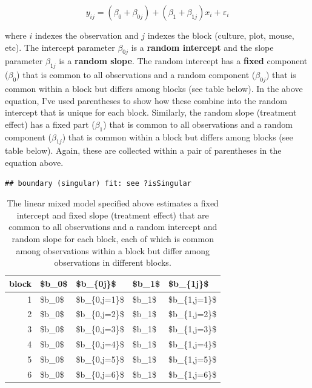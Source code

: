 \documentclass[]{book}
\begin{document}
\begin{equation}
y_{ij} = (\beta_{0} + \beta_{0j}) + (\beta_{1} + \beta_{1j}) x_i + \varepsilon_i 
\label{eq:lmm-spec1}
\end{equation}

where \(i\) indexes the observation and \(j\) indexes the block
(culture, plot, mouse, etc). The intercept parameter \(\beta_{0j}\) is a
\textbf{random intercept} and the slope parameter \(\beta_{1j}\) is a
\textbf{random slope}. The random intercept has a \textbf{fixed}
component (\(\beta_0\)) that is common to all observations and a random
component (\(\beta_{0j}\)) that is common within a block but differs
among blocks (see table below). In the above equation, I've used
parentheses to show how these combine into the random intercept that is
unique for each block. Similarly, the random slope (treatment effect)
has a fixed part (\(\beta_1\)) that is common to all observations and a
random component (\(\beta_{1j}\)) that is common within a block but
differs among blocks (see table below). Again, these are collected
within a pair of parentheses in the equation above.

\begin{verbatim}
## boundary (singular) fit: see ?isSingular
\end{verbatim}

\begin{table}[t]

\caption{\label{tab:lmm-table}The linear mixed model specified above estimates a fixed intercept and fixed slope (treatment effect) that are common to all observations and a random intercept and random slope for each block, each of which is common among observations within a block but differ among observations in different blocks.}
\centering
\begin{tabular}{r|l|l|l|l}
\hline
block & \$b\_0\$ & \$b\_\{0j\}\$ & \$b\_1\$ & \$b\_\{1j\}\$\\
\hline
1 & \$b\_0\$ & \$b\_\{0,j=1\}\$ & \$b\_1\$ & \$b\_\{1,j=1\}\$\\
\hline
2 & \$b\_0\$ & \$b\_\{0,j=2\}\$ & \$b\_1\$ & \$b\_\{1,j=2\}\$\\
\hline
3 & \$b\_0\$ & \$b\_\{0,j=3\}\$ & \$b\_1\$ & \$b\_\{1,j=3\}\$\\
\hline
4 & \$b\_0\$ & \$b\_\{0,j=4\}\$ & \$b\_1\$ & \$b\_\{1,j=4\}\$\\
\hline
5 & \$b\_0\$ & \$b\_\{0,j=5\}\$ & \$b\_1\$ & \$b\_\{1,j=5\}\$\\
\hline
6 & \$b\_0\$ & \$b\_\{0,j=6\}\$ & \$b\_1\$ & \$b\_\{1,j=6\}\$\\
\hline
\end{tabular}
\end{table}
\end{document}
